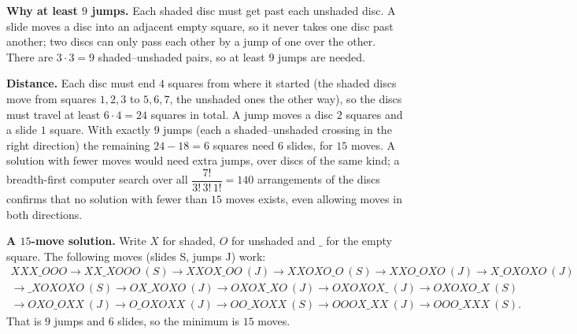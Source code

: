 \textbf{Why at least $9$ jumps.} Each shaded disc must get past each unshaded disc. A slide moves a disc into an adjacent empty square, so it never takes one disc past another; two discs can only pass each other by a jump of one over the other. There are $3\cdot3=9$ shaded--unshaded pairs, so at least $9$ jumps are needed.

\textbf{Distance.} Each disc must end $4$ squares from where it started (the shaded discs move from squares $1,2,3$ to $5,6,7$, the unshaded ones the other way), so the discs must travel at least $6\cdot4=24$ squares in total. A jump moves a disc $2$ squares and a slide $1$ square. With exactly $9$ jumps (each a shaded--unshaded crossing in the right direction) the remaining $24-18=6$ squares need $6$ slides, for $15$ moves. A solution with fewer moves would need extra jumps, over discs of the same kind; a breadth-first computer search over all $\dfrac{7!}{3!\,3!\,1!}=140$ arrangements of the discs confirms that no solution with fewer than $15$ moves exists, even allowing moves in both directions.

\textbf{A $15$-move solution.} Write $X$ for shaded, $O$ for unshaded and $\_$ for the empty square. The following moves (slides S, jumps J) work:
\[
\begin{array}{l}
XXX\_OOO\to XX\_XOOO\ (S)\to XXOX\_OO\ (J)\to XXOXO\_O\ (S)\to XXO\_OXO\ (J)\to X\_OXOXO\ (J)\\
\to \_XOXOXO\ (S)\to OX\_XOXO\ (J)\to OXOX\_XO\ (J)\to OXOXOX\_\ (J)\to OXOXO\_X\ (S)\\
\to OXO\_OXX\ (J)\to O\_OXOXX\ (J)\to OO\_XOXX\ (S)\to OOOX\_XX\ (J)\to OOO\_XXX\ (S).
\end{array}
\]
That is $9$ jumps and $6$ slides, so the minimum is $\boxed{15}$ moves.
